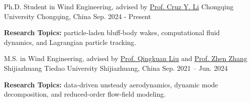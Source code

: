 
\begin{cventries}

  \cventry
    {Ph.D. Student in Wind Engineering, advised by \href{https://civil.cqu.edu.cn/info/1318/16285.htm}{\textcolor{referenceblue}{Prof. Cruz Y. Li}}}
    {Chongqing University}
    {Chongqing, China}
    {Sep. 2024 - Present}
    {
      \begin{cvitems}
        \item {\textbf{Research Topics:} particle-laden bluff-body wakes, computational fluid dynamics, and Lagrangian particle tracking.}
      \end{cvitems}
    }

  \cventry
    {M.S. in Wind Engineering, advised by 
      \href{https://yjs.stdu.edu.cn/supervisor?code=8604707}
      {\textcolor{referenceblue}{Prof. Qingkuan Liu}}
      and
      \href{https://yjs.stdu.edu.cn/supervisor?code=020210729}
      {\textcolor{referenceblue}{Prof. Zhen Zhang}}
    }
    {Shijiazhuang Tiedao University}
    {Shijiazhuang, China}
    {Sep. 2021 -- Jun. 2024}
    {
      \begin{cvitems}
        \item{\textbf{Research Topics:} data-driven unsteady aerodynamics, dynamic mode decomposition, and reduced-order flow-field modeling.}
      \end{cvitems}
    }


\end{cventries}
